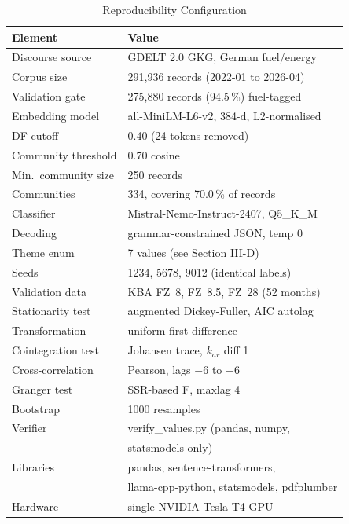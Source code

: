 \documentclass[conference]{IEEEtran}
\begin{document}
\begin{table}[t]
\caption{Reproducibility Configuration}
\label{tab:repro}
\centering \small
\begin{tabular}{@{}ll@{}}
\toprule
\textbf{Element} & \textbf{Value} \\ \midrule
Discourse source & GDELT 2.0 GKG, German fuel/energy \\
Corpus size & 291{,}936 records (2022-01 to 2026-04) \\
Validation gate & 275{,}880 records (94.5\,\%) fuel-tagged \\
Embedding model & all-MiniLM-L6-v2, 384-d, L2-normalised \\
DF cutoff & 0.40 (24 tokens removed) \\
Community threshold & 0.70 cosine \\
Min.\ community size & 250 records \\
Communities & 334, covering 70.0\,\% of records \\
Classifier & Mistral-Nemo-Instruct-2407, Q5\_K\_M \\
Decoding & grammar-constrained JSON, temp 0 \\
Theme enum & 7 values (see Section III-D) \\
Seeds & 1234, 5678, 9012 (identical labels) \\
Validation data & KBA FZ~8, FZ~8.5, FZ~28 (52 months) \\
Stationarity test & augmented Dickey-Fuller, AIC autolag \\
Transformation & uniform first difference \\
Cointegration test & Johansen trace, $k_{ar}$ diff 1 \\
Cross-correlation & Pearson, lags $-6$ to $+6$ \\
Granger test & SSR-based F, maxlag 4 \\
Bootstrap & 1000 resamples \\
Verifier & verify\_values.py (pandas, numpy, \\
 & statsmodels only) \\
Libraries & pandas, sentence-transformers, \\
 & llama-cpp-python, statsmodels, pdfplumber \\
Hardware & single NVIDIA Tesla T4 GPU \\
\bottomrule
\end{tabular}
\end{table}

\end{document}
